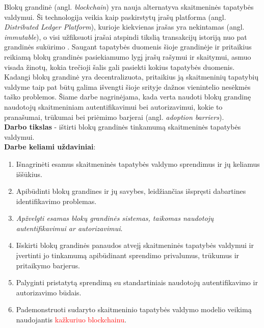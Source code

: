 Blokų grandinė (angl. \textit{blockchain}) yra nauja alternatyva skaitmeninės tapatybės valdymui. Ši technologija veikia kaip
paskirstytų įrašų platforma (angl. \textit{Distributed Ledger Platform}), kurioje kiekvienas įrašas yra nekintamas (angl. \textit{immutable}), o visi
užfiksuoti įrašai atspindi tikslią transakcijų istoriją nuo pat grandinės sukūrimo \cite{Baars2016}. Saugant tapatybės duomenis šioje grandinėje ir
pritaikius reikiamą blokų grandinės pasiekiamumo lygį įrašų rašymui ir skaitymui, asmuo visada
žinotų, kokia trečioji šalis gali pasiekti kokius tapatybės duomenis. Kadangi blokų grandinė yra decentralizuota, pritaikius ją skaitmeninių tapatybių valdyme taip pat
būtų galima išvengti šioje srityje dažnos vienintelio nesėkmės taško problemos. Šiame darbe nagrinėjama, kada verta naudoti blokų grandinę
naudotojų skaitmeniniam autentifikavimui bei autorizavimui, kokie to pranašumai, trūkumai bei priėmimo barjerai (angl. \textit{adoption barriers}).
\\

\textbf{Darbo tikslas} - ištirti blokų grandinės tinkamumą skaitmeninės tapatybės valdymui.
\\

\textbf{Darbe keliami uždaviniai}:

\begin{enumerate}
    \item Išnagrinėti esamus skaitmeninės tapatybės valdymo sprendimus ir jų keliamus iššūkius.
    \item Apibūdinti blokų grandines ir jų savybes, leidžiančias išspręsti dabartines identifikavimo problemas.
    \item \textit{Apžvelgti esamas blokų grandinės sistemas, taikomas naudotojų autentifikavimui ar autorizavimui}.
    \item Išskirti blokų grandinės panaudos atvejį skaitmeninės tapatybės valdymui ir įvertinti jo tinkamumą apibūdinant sprendimo privalumus,
    trūkumus ir pritaikymo barjerus.
    \item Palyginti pristatytą sprendimą su standartiniais naudotojų autentifikavimo ir autorizavimo būdais.
    \item Pademonstruoti sudaryto skaitmeninio tapatybės valdymo modelio veikimą naudojantis \textcolor{red}{kažkuriuo blockchainu}.
\end{enumerate}